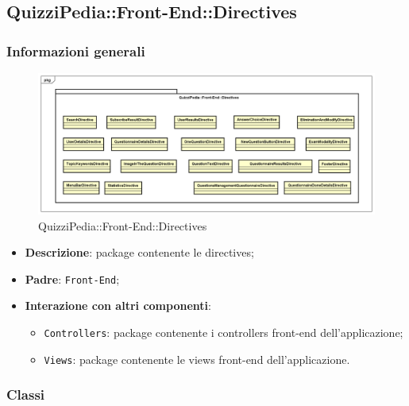 \newpage

\subsection{QuizziPedia::Front-End::Directives}
\subsubsection{Informazioni generali}
\label{QuizziPedia::Front-End::Directives}
\begin{figure}
	\centering
	\includegraphics[scale=0.45]{UML/Package/QuizziPedia_Front-End_Directives.png}
	\caption{QuizziPedia::Front-End::Directives}
\end{figure}
\begin{itemize}
	\item \textbf{Descrizione}: package contenente le directives;
	\item \textbf{Padre}: \texttt{Front-End};
	\item \textbf{Interazione con altri componenti}:
	\begin{itemize}
		\item \texttt{Controllers}: package contenente i controllers front-end dell'applicazione;
		\item \texttt{Views}: package contenente le views front-end dell'applicazione.
	\end{itemize}
\end{itemize}
\subsubsection{Classi}



